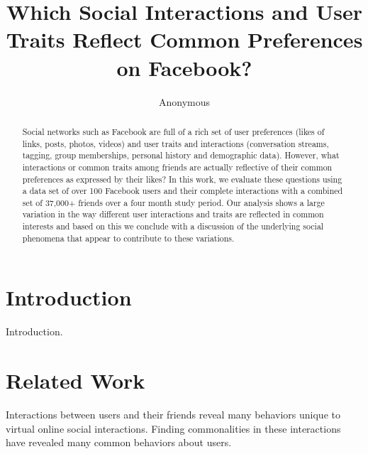 \documentclass[letterpaper]{article}
\begin{document}
%
\title{Which Social Interactions and User Traits Reflect Common Preferences on Facebook?}
\author{Anonymous}
\maketitle
\begin{abstract}
Social networks such as Facebook are full of a rich set of user preferences (likes of links, posts, photos, videos) and user traits and interactions (conversation streams, tagging, group memberships, personal history and demographic data). However, what interactions or common traits among friends are actually reflective of their common preferences as expressed by their likes? In this work, we evaluate these questions using a data set of over 100 Facebook users and their complete interactions with a combined set of 37,000+ friends over a four month study period. Our analysis shows a large variation in the way different user interactions and traits are reflected in common interests and based on this we conclude with a discussion of the underlying social phenomena that appear to contribute to these variations.
\end{abstract}


\section{Introduction}


Introduction. \cite{influence}


\section{Related Work}


Interactions between users and their friends reveal many behaviors unique to virtual online social interactions. Finding commonalities in these interactions have revealed many common behaviors about users.
\end{document}
